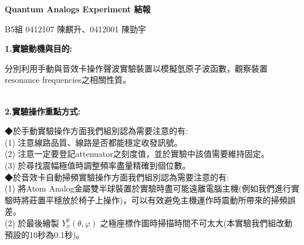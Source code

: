 \documentclass[UTF8]{ctexart}
\begin{document}
\begin{CJK*}{UTF8}{song}
\setlength{\baselineskip}{20pt} %

\begin{center}
\begin{LARGE} 
\textbf{Quantum Analogs Experiment 結報} \\
\end{LARGE}
\begin{large} 
B5組 0412107 陳麒升、0412001 陳勁宇  
\end{large}
\end{center}

\begin{large}
\textbf{1.實驗動機與目的:} \\
\end{large}
分別利用手動與音效卡操作聲波實驗裝置以模擬氫原子波函數，觀察裝置resonance frequencies之相關性質。 \\
 \\
%
\begin{large}
\textbf{2.實驗操作重點方式:} \\
\end{large}
◆於手動實驗操作方面我們組別認為需要注意的有: \\
(1) 注意線路品質、線路是否都能穩定收發訊號。 \\
(2) 注意一定要登記attenuator之刻度值，並於實驗中該值需要維持固定。 \\
(3) 於尋找震幅極值時調整頻率盡量精確到個位數。 \\
◆於音效卡自動掃頻實驗操作方面我們組別認為需要注意的有: \\
(1) 將Atom Analog金屬雙半球裝置於實驗時盡可能遠離電腦主機(例如我們進行實驗時將莊置平穩放於椅子上操作)，可以有效避免主機運作時震動所帶來的掃頻誤差。 \\
(2) 於最後繪製 $Y^{0}_{x}(\theta,\varphi)$ 之極座標作圖時掃描時間不可太大(本實驗我們組改動預設的10秒為0.1秒)。  \\
%



\end{CJK*}
\end{document}
